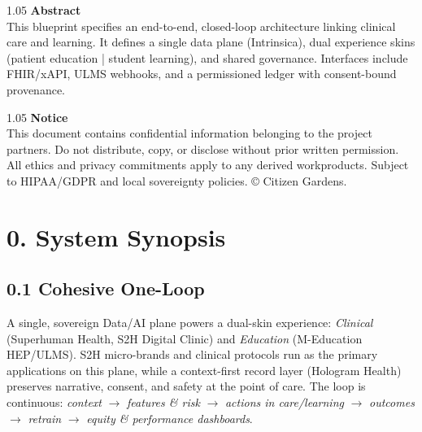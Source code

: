 \documentclass[11pt]{article}
\theoremstyle{plain}
\begin{document}
\begin{titlepage}
  \vspace{1.2cm}

  \begin{spacing}{1.05}\small
  \textbf{Abstract} \\
  This blueprint specifies an end-to-end, closed-loop architecture linking clinical care and learning. It defines a single data plane (Intrinsica), dual experience skins (patient education | student learning), and shared governance. Interfaces include FHIR/xAPI, ULMS webhooks, and a permissioned ledger with consent-bound provenance.
  \end{spacing}

  \vfill

  \begin{spacing}{1.05}\footnotesize
  \textbf{Notice} \\
  This document contains confidential information belonging to the project partners. Do not distribute, copy, or disclose without prior written permission. All ethics and privacy commitments apply to any derived workproducts. Subject to HIPAA/GDPR and local sovereignty policies. © Citizen Gardens.
  \end{spacing}

\end{titlepage}




\newpage
\section*{0. System Synopsis}

\subsection*{0.1 Cohesive One-Loop}
A single, sovereign Data/AI plane powers a dual-skin experience: \emph{Clinical} (Superhuman Health, S2H Digital Clinic) and \emph{Education} (M-Education HEP/ULMS). S2H micro-brands and clinical protocols run as the primary applications on this plane, while a context-first record layer (Hologram Health) preserves narrative, consent, and safety at the point of care. The loop is continuous: \emph{context} $\rightarrow$ \emph{features \& risk} $\rightarrow$ \emph{actions in care/learning} $\rightarrow$ \emph{outcomes} $\rightarrow$ \emph{retrain} $\rightarrow$ \emph{equity \& performance dashboards}.
\end{document}
